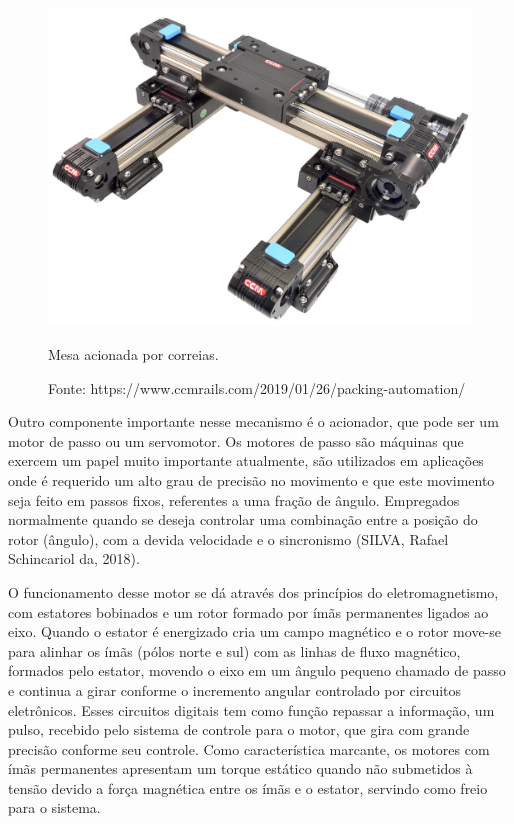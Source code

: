 \begin{figure}[!htb]
\centering
\includegraphics[scale = 0.065]{figuras/2-3}
\caption{Mesa acionada por correias.}
\caption*{Fonte: https://www.ccmrails.com/2019/01/26/packing-automation/}
\label{fig:mcorreia}
\end{figure}
    
Outro componente importante nesse mecanismo é o acionador, que pode ser um motor de passo ou um servomotor. 
Os motores  de passo são máquinas que exercem um papel muito importante atualmente, são utilizados em 
aplicações onde é requerido um alto grau de precisão no movimento e que este movimento seja feito em passos 
fixos, referentes a uma fração de ângulo. Empregados normalmente quando se deseja controlar uma combinação 
entre a posição do rotor (ângulo), com a devida velocidade e o sincronismo (SILVA, Rafael Schincariol da, 2018).

O funcionamento desse motor se dá através dos princípios do eletromagnetismo, com estatores bobinados e um rotor 
formado por ímãs permanentes ligados ao eixo. Quando o estator é energizado cria um campo magnético e o rotor 
move-se para alinhar os ímãs (pólos norte e sul) com as linhas de  fluxo magnético, formados pelo estator, 
movendo o eixo em um ângulo pequeno chamado de passo e continua a girar conforme o incremento angular controlado 
por circuitos eletrônicos. Esses circuitos digitais tem como função repassar a informação, um pulso, recebido 
pelo sistema de controle para o motor, que gira com grande precisão conforme seu controle. Como característica 
marcante, os motores com ímãs permanentes apresentam um torque estático quando não submetidos à tensão devido 
a força magnética entre os ímãs e o estator, servindo como freio para o sistema.
 
